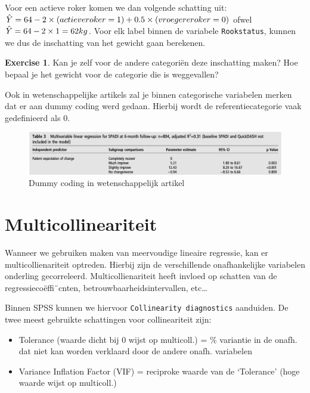 \documentclass[
]{book}
\providecommand{\tightlist}{%
  \setlength{\itemsep}{0pt}\setlength{\parskip}{0pt}}
\theoremstyle{definition}
\theoremstyle{definition}
\theoremstyle{definition}
\newtheorem{exercise}{Exercise}[chapter]
\theoremstyle{definition}
\theoremstyle{remark}
\begin{document}
Voor een actieve roker komen we dan volgende schatting uit: \(\hat{Y} = 64 - 2 \times (actieve \space roker = 1) + 0.5 \times (vroegere \space roker = 0)\) ofwel \(\hat{Y} = 64 - 2 \times 1 = 62 \space kg\). Voor elk label binnen de variabele \texttt{Rookstatus}, kunnen we dus de inschatting van het gewicht gaan berekenen.

\begin{exercise}
Kan je zelf voor de andere categoriën deze inschatting maken? Hoe bepaal je het gewicht voor de categorie die is weggevallen?
\end{exercise}

Ook in wetenschappelijke artikels zal je binnen categorische variabelen merken dat er aan dummy coding werd gedaan. Hierbij wordt de referentiecategorie vaak gedefinieerd als \(0\).

\begin{figure}
\includegraphics[width=1\linewidth]{img/chester_dummy} \caption{Dummy coding in wetenschappelijk artikel}\label{fig:chesterdummy}
\end{figure}

\hypertarget{multicollineariteit}{%
\section*{Multicollineariteit}\label{multicollineariteit}}


Wanneer we gebruiken maken van meervoudige lineaire regressie, kan er multicollienariteit optreden. Hierbij zijn de verschillende onafhankelijke variabelen onderling gecorreleerd. Multicollienariteit heeft invloed op schatten van de regressiecoëffi¨cnten, betrouwbaarheidsintervallen, etc\ldots{}

Binnen {SPSS} kunnen we hiervoor \texttt{Collinearity\ diagnostics} aanduiden. De twee meest gebruikte schattingen voor collineariteit zijn:

\begin{itemize}
\tightlist
\item
  Tolerance (waarde dicht bij 0 wijst op multicoll.) = \% variantie in de onafh. dat niet kan worden verklaard door de andere onafh. variabelen
\item
  Variance Inflation Factor (VIF) = reciproke waarde van de `Tolerance' (hoge waarde wijst op multicoll.)
\end{itemize}
\end{document}
